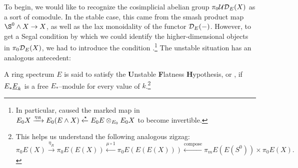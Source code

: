 To begin, we would like to recognize the cosimplicial abelian group $\pi_0 \mathcal{UD}_E(X)$ as a sort of comodule.  In the stable case, this came from the smash product map $\S^0 \sm X \to X$, as well as the lax monoidality of the functor $\mathcal{D}_E(-)$.  However, to get a Segal condition by which we could identify the higher-dimensional objects in $\pi_0 \mathcal{D}_E(X)$, we had to introduce the condition {\FH}.\footnote{In particular, {\FH} caused the marked map in $E_0 X \xrightarrow{\eta_R} E_0(E \wedge X) \xleftarrow{\star} E_0 E \otimes_{E_0} E_0 X$ to become invertible.}  The unstable situation has an analogous antecedent:

\begin{definition}
A ring spectrum $E$ is said to satisfy the \textbf{U}nstable \textbf{F}latness \textbf{H}ypothesis, or \UFH, if $E_* \underline{\smash{E}}_{k}$ is a free $E_*$--module for every value of $k$.\footnote{This helps us understand the following analogous zigzag: \[\pi_0 E(X) \xrightarrow{\eta_R} \pi_0 E(E(X)) \xleftarrow{\mu \circ 1} \pi_0 E(E(E(X))) \xleftarrow{\mathrm{compose}} \pi_m E(E(S^0)) \times \pi_0 E(X).\]}
\end{definition}

